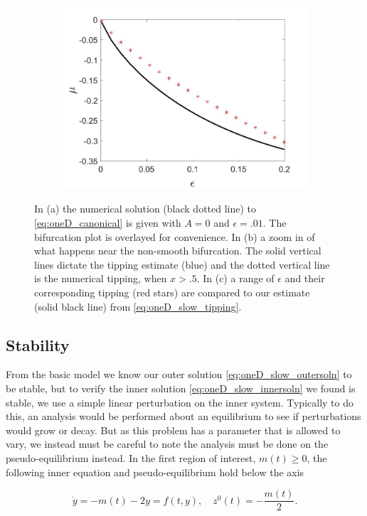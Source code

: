 \begin{figure}[H]
\begin{subfigure}{.5\textwidth}
\includegraphics[width=\linewidth]{oneD/slow_epscomp.jpg}
\caption{}
\label{fig:oneD_slow_comp}
\end{subfigure}
\caption{In (a) the numerical solution (black dotted line) to \eqref{eq:oneD_canonical} is given with $A=0$ and $\epsilon=.01$. The bifurcation plot is overlayed for convenience. In (b) a zoom in of what happens near the non-smooth bifurcation. The solid vertical lines dictate the tipping estimate (blue) and the dotted vertical line is the numerical tipping, when $x>.5$. In (c) a range of $\epsilon$ and their corresponding tipping (red stars) are compared to our estimate (solid black line) from \eqref{eq:oneD_slow_tipping}.}
\label{fig:oneD_slow_numerics}
\end{figure}


\subsection{Stability}
From the basic model we know our outer solution \eqref{eq:oneD_slow_outersoln} to be stable, but to verify the inner solution \eqref{eq:oneD_slow_innersoln} we found is stable, we use a simple linear perturbation on the inner system. Typically to do this, an analysis would be performed about an equilibrium to see if perturbations would grow or decay. But as this problem has a parameter that is allowed to vary, we instead must be careful to note the analysis must be done on the pseudo-equilibrium instead. In the first region of interest, $m(t)\ge 0$, the following inner equation and pseudo-equilibrium hold below the axis

\begin{equation}\label{eq:oneD_slow_stability1}
\dot{y}=-m(t)-2y=f(t,y), \quad z^0(t)=-\frac{m(t)}{2}.
\end{equation}

